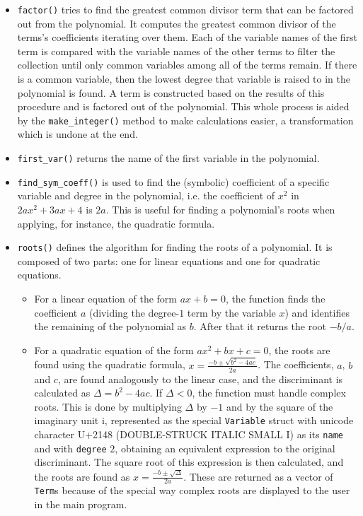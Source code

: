 \begin{itemize}
    \item \verb|factor()| tries to find the greatest common divisor term that can be factored out from the polynomial. It computes the greatest common divisor of the terms's coefficients iterating over them. Each of the variable names of the first term is compared with the variable names of the other terms to filter the collection until only common variables among all of the terms remain. If there is a common variable, then the lowest degree that variable is raised to in the polynomial is found. A term is constructed based on the results of this procedure and is factored out of the polynomial. This whole process is aided by the \verb|make_integer()| method to make calculations easier, a transformation which is undone at the end.
    \item \verb|first_var()| returns the name of the first variable in the polynomial.
    \item \verb|find_sym_coeff()| is used to find the (symbolic) coefficient of a specific variable and degree in the polynomial, i.e. the coefficient of $x^2$ in $2ax^2 + 3ax + 4$ is $2a$. This is useful for finding a polynomial's roots when applying, for instance, the quadratic formula.
    \item \verb|roots()| defines the algorithm for finding the roots of a polynomial. It is composed of two parts: one for linear equations and one for quadratic equations.
    \begin{itemize}
        \item For a linear equation of the form $ax + b = 0$, the function finds the coefficient $a$ (dividing the degree-$1$ term by the variable $x$) and identifies the remaining of the polynomial as $b$. After that it returns the root $-b/a$.
        \item For a quadratic equation of the form $ax^2 + bx + c = 0$, the roots are found using the quadratic formula, $x = \frac{-b \pm \sqrt{b^2 - 4ac}}{2a}$. The coefficients, $a$, $b$ and $c$, are found analogously to the linear case, and the discriminant is calculated as $\Delta = b^2 - 4ac$. If $\Delta < 0$, the function must handle complex roots. This is done by multiplying $\Delta$ by $-1$ and by the square of the imaginary unit $\mathrm{i}$, represented as the special \verb|Variable| struct with unicode character U+2148 (DOUBLE-STRUCK ITALIC SMALL I) as its \verb|name| and with \verb|degree| $2$, obtaining an equivalent expression to the original discriminant. The square root of this expression is then calculated, and the roots are found as $x = \frac{-b \pm \sqrt{\Delta}}{2a}$. These are returned as a vector of \verb|Term|s because of the special way complex roots are displayed to the user in the main program.  %
    \end{itemize}
\end{itemize}

